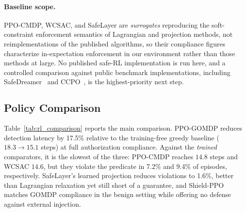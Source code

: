\documentclass[letterpaper]{article} %
\begin{document}
\paragraph{Baseline scope.} PPO-CMDP, WCSAC, and SafeLayer are \emph{surrogates} reproducing the soft-constraint enforcement semantics of Lagrangian and projection methods, not reimplementations of the published algorithms, so their compliance figures characterize in-expectation enforcement in our environment rather than those methods at large. No published safe-RL implementation is run here, and a controlled comparison against public benchmark implementations, including SafeDreamer~\citep{huang2024safedreamer} and CCPO~\citep{yao2023ccpo}, is the highest-priority next step.

\subsection{Policy Comparison}
\label{sec:simresults}

Table~\ref{tab:rl_comparison} reports the main comparison. PPO-GOMDP reduces detection latency by 17.5\% relative to the training-free greedy baseline ($18.3\to15.1$ steps) at full authorization compliance. Against the \emph{trained} comparators, it is the slowest of the three: PPO-CMDP reaches $14.8$ steps and WCSAC $14.6$, but they violate the predicate in 7.2\% and 9.4\% of episodes, respectively. SafeLayer's learned projection reduces violations to 1.6\%, better than Lagrangian relaxation yet still short of a guarantee, and Shield-PPO matches GOMDP compliance in the benign setting while offering no defense against external injection.
\end{document}
